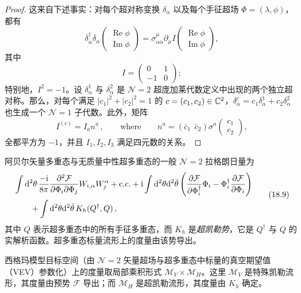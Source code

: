 \begin{proof}
这来自下述事实：对每个超对称变换 $\delta_\alpha$ 以及每个手征超场 $\Phi=(\lambda,\phi)$，都有
\[
\delta^\dagger_{\dot\alpha}\delta_\alpha
\begin{pmatrix} \operatorname{Re}\phi\\ \operatorname{Im}\phi\end{pmatrix}
=\sigma^\mu_{\alpha\dot\alpha}\partial_\mu I
\begin{pmatrix} \operatorname{Re}\phi\\ \operatorname{Im}\phi\end{pmatrix},
\]
其中
\[
I=\begin{pmatrix} 0 & 1\\ -1 & 0\end{pmatrix};
\]
特别地，$I^2=-1$。设 $\delta^1_\alpha$ 与 $\delta^2_\alpha$ 是 $\mathcal N=2$ 超庞加莱代数定义中出现的两个独立超对称。那么，对每个满足 $|c_1|^2+|c_2|^2=1$ 的 $c=(c_1,c_2)\in\mathbb{C}^2$，$\delta^c_\alpha=c_1\delta^1_\alpha+c_2\delta^2_\alpha$ 也生成一个 $\mathcal N=1$ 子代数。此外，矩阵
\[
I^{(c)}=I_a n^a\,,\qquad\text{where}\qquad
n^a=\left(\bar c_1\ \ \bar c_2\right)\sigma^a
\begin{pmatrix} c_1\\ c_2\end{pmatrix},
\]
全都平方为 $-1$，并且 $I_1,I_2,I_3$ 满足四元数的关系。
\end{proof}

阿贝尔矢量多重态与无质量中性超多重态的一般 $\mathcal N=2$ 拉格朗日量为
\begin{equation}
\begin{aligned}
&\int\mathrm{d}^2\theta\,\frac{-\mathrm{i}}{8\pi}\frac{\partial^2\mathcal F}{\partial\Phi_i\partial\Phi_j}W_{i,\alpha}W^\alpha_j+\text{c.c.}
+\mathrm{i}\int\mathrm{d}^2\theta\mathrm{d}^2\bar\theta\left(\frac{\partial\mathcal F}{\partial\Phi^\dagger_i}\Phi_i-\Phi_i^\dagger\frac{\partial\mathcal F}{\partial\Phi_i}\right)\\
&\qquad+\int\mathrm{d}^2\theta\mathrm{d}^2\bar\theta\,K_h(Q^\dagger,Q)\,,
\end{aligned}
\tag{18.9}
\end{equation}
其中 $Q$ 表示超多重态中的所有手征多重态，而 $K_h$ 是\emph{超凯勒势}，它是 $Q^\dagger$ 与 $Q$ 的实解析函数。超多重态标量流形上的度量由该势导出。

\begin{proposition}[18.8]
西格玛模型目标空间（由 $\mathcal N=2$ 矢量超场与超多重态中标量的真空期望值（VEV）参数化）上的度量取局部乘积形式 $\mathcal M_V\times\mathcal M_H$。这里 $\mathcal M_V$ 是特殊凯勒流形，其度量由预势 $\mathcal F$ 导出；而 $\mathcal M_H$ 是超凯勒流形，其度量由 $K_h$ 确定。
\end{proposition}


